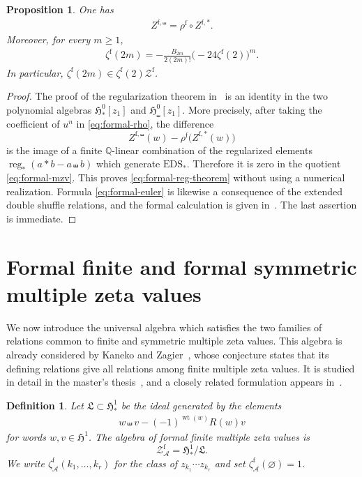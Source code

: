 \documentclass[12pt]{amsart}
\numberwithin{equation}{section}
\theoremstyle{plain}
\newtheorem{prop}[prop]{Proposition}
\newtheorem{dfn}[dfn]{Definition}
\newcommand{\QQ}{\mathbb{Q}}
\DeclareMathOperator{\wt}{wt}
\newcommand{\h}{\mathfrak H}
\newcommand{\Zf}{{\mathcal Z^{\mathrm f}}}
\newcommand{\ZAf}{{\mathcal Z_{\mathcal A}^{\mathrm f}}}
\newcommand{\zf}[1]{\zeta^{\mathrm f}(#1)}
\newcommand{\zaf}[1]{\zeta_{\mathcal A}^{\mathrm f}(#1)}
\begin{document}
\begin{prop}\label{prop:formal-regularization}
One has
\begin{align}\label{eq:formal-reg-theorem}
 Z^{\mathrm f,\shuffle}=\rho^{\mathrm f}\circ Z^{\mathrm f,*}.
\end{align}
Moreover, for every $m\geq1$,
\begin{align}\label{eq:formal-euler}
 \zf{2m}=-\frac{B_{2m}}{2(2m)!}\bigl(-24\zf{2}\bigr)^m.
\end{align}
In particular, $\zf{2m}\in\zf{2}\Zf$.
\end{prop}

\begin{proof}
The proof of the regularization theorem in~\cite[Theorem~2]{IKZ} is an identity in the two polynomial algebras $\h^0_*[z_1]$ and $\h^0_\shuffle[z_1]$. More precisely, after taking the coefficient of $u^n$ in \eqref{eq:formal-rho}, the difference
\[
 Z^{\mathrm f,\shuffle}(w)-\rho^{\mathrm f}
 \bigl(Z^{\mathrm f,*}(w)\bigr)
\]
is the image of a finite $\QQ$-linear combination of the regularized elements
$\operatorname{reg}_*(a*b-a\shuffle b)$ which generate $\mathrm{EDS}_*$. Therefore it is zero in the quotient \eqref{eq:formal-mzv}. This proves \eqref{eq:formal-reg-theorem} without using a numerical realization. Formula \eqref{eq:formal-euler} is likewise a consequence of the extended double shuffle relations, and the formal calculation is given in~\cite[Section~2.2]{BIM}. The last assertion is immediate.
\end{proof}

\section{Formal finite and formal symmetric multiple zeta values}\label{sec:formal-finite}

We now introduce the universal algebra which satisfies the two families of relations common to finite and symmetric multiple zeta values.
This algebra is already considered by Kaneko and Zagier~\cite{KZ},
whose conjecture states that its defining relations give all relations
among finite multiple zeta values. It is studied in detail in the
master's thesis~\cite{Risan}, and a closely related formulation
appears in~\cite[Section~7]{Anzawa}.

\begin{dfn}\label{def:formal-finite}
Let $\mathfrak L\subset\h^1_*$ be the ideal generated by the elements
\begin{align}\label{eq:formal-linear-shuffle}
 w\shuffle v-(-1)^{\wt(w)}R(w)v
\end{align}
for words $w,v\in\h^1$.
The algebra of \emph{formal finite multiple zeta values} is
\[
 \ZAf=\h^1_*/\mathfrak L.
\]
We write $\zaf{k_1,\ldots,k_r}$ for the class of $z_{k_1}\cdots z_{k_r}$ and set $\zaf{\varnothing}=1$.
\end{dfn}
\end{document}
